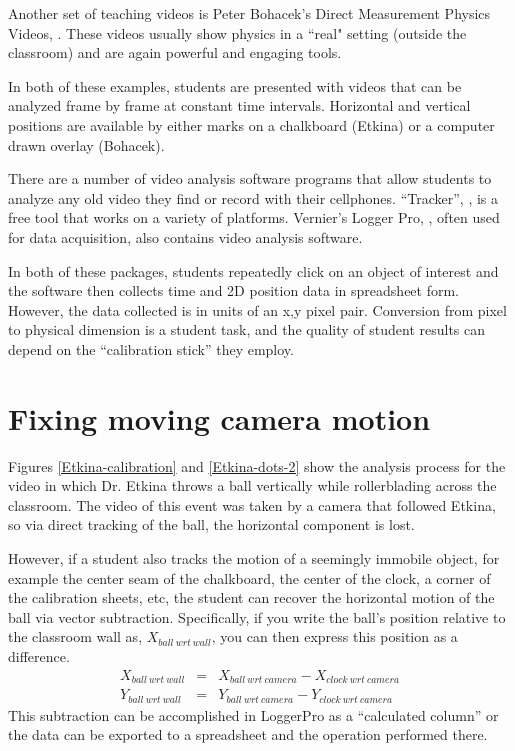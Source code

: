 \documentclass[12pt]{iopart}
\newcommand{\bea}{\begin{eqnarray}}
\newcommand{\eea}{\end{eqnarray}}
\begin{document}
Another set of teaching videos is Peter Bohacek's Direct Measurement Physics Videos, \cite{Bohacek_overview} .
These videos usually show physics in a ``real" setting (outside the classroom) and are again powerful and engaging tools.  

In both of these examples, students are presented with videos that can be analyzed frame by frame at constant time intervals.  Horizontal and vertical positions are available by either marks on a chalkboard (Etkina) or a computer drawn overlay (Bohacek).  

There are a number of video analysis software programs that allow students to analyze any old video they find or record with their cellphones.  ``Tracker'', \cite{Tracker}, is a free tool that works on a variety of platforms. Vernier's Logger Pro, \cite{LoggerPro}, often used for data acquisition, also contains video analysis software.  

In both of these packages, students repeatedly click on an object of interest and the software then collects time and 2D position data  in spreadsheet form.  However, the data collected is in units of an x,y pixel pair.  Conversion from pixel to physical dimension is a student task, and the quality of student results can depend on the ``calibration stick''\cite{calibration_stick} they employ.

\section{Fixing moving camera motion} 
Figures \ref{Etkina-calibration} and \ref{Etkina-dots-2} show the analysis process for the video in which Dr. Etkina throws a ball vertically while rollerblading across the classroom.  The video of this event was taken by a camera that followed Etkina, so via direct tracking of the ball, the horizontal component is lost.

However, if a student also tracks the motion of a seemingly immobile object, for example the center seam of the chalkboard, the center of the clock, a corner of the calibration sheets, etc, the student can recover the horizontal motion of the ball via vector subtraction.  Specifically, if you write  the ball's position relative to the classroom wall as, $X_{ball~wrt~wall}$, you can then express this position as a difference.
\bea
X_{ball~wrt~wall} &=& X_{ball~wrt~camera}-X_{clock~wrt~camera} \nonumber\\ 
Y_{ball~wrt~wall} &=& Y_{ball~wrt~camera}-Y_{clock~wrt~camera}\nonumber
\eea
This subtraction can be accomplished in LoggerPro as a ``calculated column'' or the data can be exported to a spreadsheet and the operation performed there.  
\end{document}
